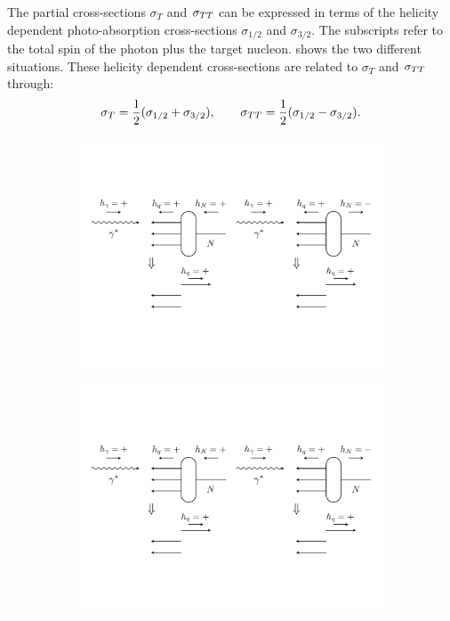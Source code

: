 The partial cross-sections $\sigma_T$ and $\sigma_{TT}$ can be expressed in terms of the helicity dependent photo-absorption cross-sections $\sigma_{1/2}$ and $\sigma_{3/2}$. The subscripts refer to the total spin of the photon plus the target nucleon.  shows the two different situations. These helicity dependent cross-sections are related to $\sigma_T$ and $\sigma_{TT}$ through:
\begin{equation} \label{C2S4SS1E5}
\sigma_T = \frac{1}{2}(\sigma_{1/2}+\sigma_{3/2}), \qquad \sigma_{TT} = \frac{1}{2}(\sigma_{1/2}-\sigma_{3/2}).
\end{equation}

\begin{figure}[tb!]
  \centering
  \begin{subfigure}[t]{0.4\textwidth}
    \includegraphics[width=\textwidth]{figs/photon-absorption-a.pdf}
    \subcaption{{} \label{C2S4SS1F1A}}
  \end{subfigure}
  \qquad
  \qquad
  \begin{subfigure}[t]{0.4\textwidth}
    \includegraphics[width=\textwidth]{figs/photon-absorption-b.pdf}

\end{subfigure}
\end{figure}
